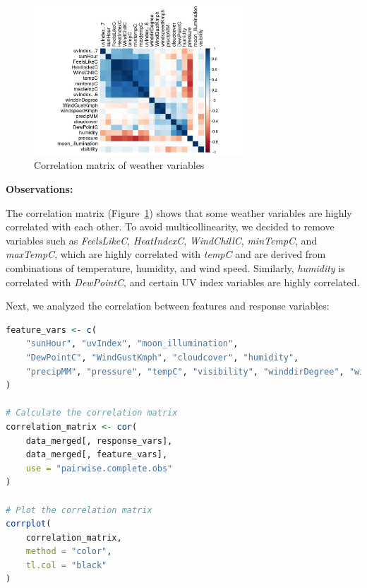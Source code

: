 \documentclass[12pt]{article}
\begin{document}
\begin{figure}[h]
    \centering
    \includegraphics[width=0.7\textwidth]{correlation-matrix.png}
    \caption{Correlation matrix of weather variables}
    \label{fig:correlation_matrix}
\end{figure}

\textbf{Observations:}

The correlation matrix (Figure~\ref{fig:correlation_matrix}) shows that some weather variables are highly correlated with each other. To avoid multicollinearity, we decided to remove variables such as \textit{FeelsLikeC}, \textit{HeatIndexC}, \textit{WindChillC}, \textit{minTempC}, and \textit{maxTempC}, which are highly correlated with \textit{tempC} and are derived from combinations of temperature, humidity, and wind speed. Similarly, \textit{humidity} is correlated with \textit{DewPointC}, and certain UV index variables are highly correlated.

Next, we analyzed the correlation between features and response variables:

\begin{lstlisting}[language=R]
feature_vars <- c(
    "sunHour", "uvIndex", "moon_illumination",
    "DewPointC", "WindGustKmph", "cloudcover", "humidity",
    "precipMM", "pressure", "tempC", "visibility", "winddirDegree", "windspeedKmph"
)

# Calculate the correlation matrix
correlation_matrix <- cor(
    data_merged[, response_vars],
    data_merged[, feature_vars],
    use = "pairwise.complete.obs"
)

# Plot the correlation matrix
corrplot(
    correlation_matrix,
    method = "color",
    tl.col = "black"
)
\end{lstlisting}
\end{document}

